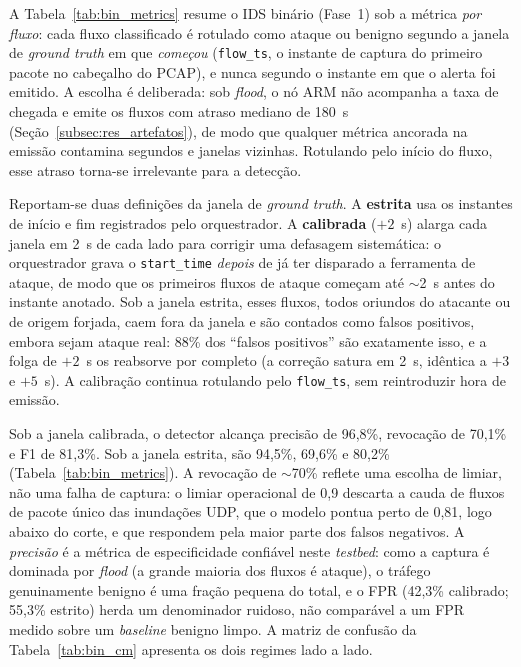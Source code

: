 \documentclass[12pt]{article}
\begin{document}
A Tabela~\ref{tab:bin_metrics} resume o IDS binário (Fase~1) sob a métrica
\emph{por fluxo}: cada fluxo classificado é rotulado como ataque ou benigno
segundo a janela de \textit{ground truth} em que \emph{começou}
(\texttt{flow\_ts}, o instante de captura do primeiro pacote no cabeçalho do
PCAP), e nunca segundo o instante em que o alerta foi emitido. A escolha é
deliberada: sob \textit{flood}, o nó ARM não acompanha a taxa de chegada e emite
os fluxos com atraso mediano de 180~s (Seção~\ref{subsec:res_artefatos}), de modo
que qualquer métrica ancorada na emissão contamina segundos e janelas vizinhas.
Rotulando pelo início do fluxo, esse atraso torna-se irrelevante para a detecção.

Reportam-se duas definições da janela de \textit{ground truth}. A
\textbf{estrita} usa os instantes de início e fim registrados pelo orquestrador.
A \textbf{calibrada} ($+2$~s) alarga cada janela em 2~s de cada lado para
corrigir uma defasagem sistemática: o orquestrador grava o \texttt{start\_time}
\emph{depois} de já ter disparado a ferramenta de ataque, de modo que os
primeiros fluxos de ataque começam até $\sim$2~s antes do instante anotado. Sob
a janela estrita, esses fluxos, todos oriundos do atacante ou de origem
forjada, caem fora da janela e são contados como falsos positivos, embora
sejam ataque real: 88\% dos ``falsos positivos'' são exatamente isso, e a folga
de $+2$~s os reabsorve por completo (a correção satura em 2~s, idêntica a $+3$ e
$+5$~s). A calibração continua rotulando pelo \texttt{flow\_ts}, sem reintroduzir
hora de emissão.

Sob a janela calibrada, o detector alcança precisão de 96,8\%, revocação de 70,1\%
e F1 de 81,3\%. Sob a janela estrita, são 94,5\%, 69,6\% e 80,2\% (Tabela~\ref{tab:bin_metrics}).
A revocação de $\sim$70\% reflete uma escolha de limiar, não uma falha de captura:
o limiar operacional de 0,9 descarta a cauda de fluxos de pacote único das
inundações UDP, que o modelo pontua perto de 0,81, logo abaixo do corte, e que
respondem pela maior parte dos falsos negativos. A \emph{precisão} é a métrica de
especificidade confiável neste \textit{testbed}: como a captura é dominada por
\textit{flood} (a grande maioria dos fluxos é ataque), o tráfego genuinamente
benigno é uma fração pequena do total, e o FPR (42,3\% calibrado; 55,3\% estrito)
herda um denominador ruidoso, não comparável a um FPR medido sobre um
\textit{baseline} benigno limpo. A matriz de confusão da Tabela~\ref{tab:bin_cm}
apresenta os dois regimes lado a lado.
\end{document}
